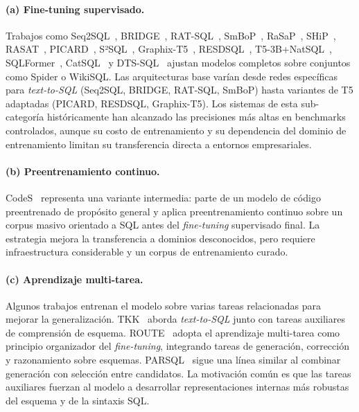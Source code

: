 \paragraph{(a) Fine-tuning supervisado.} Trabajos como
Seq2SQL~\cite{Seq2SQL2017}, BRIDGE~\cite{BRIDGE2020},
RAT-SQL~\cite{RAT-SQL2021}, SmBoP~\cite{SmBoP2021},
RaSaP~\cite{RaSaP2021}, SHiP~\cite{SHiP2022},
RASAT~\cite{RASAT2022}, PICARD~\cite{PICARD2022},
S²SQL~\cite{S2SQL2022}, Graphix-T5~\cite{Graphix-T52022},
RESDSQL~\cite{RESDSQL2023}, T5-3B+NatSQL~\cite{T5-3B+NatSQL+TokenPreprocessing2023},
SQLFormer~\cite{SQLFormer2023}, CatSQL~\cite{CatSQL2023} y
DTS-SQL~\cite{DTS-SQL2024} ajustan modelos completos sobre conjuntos como
Spider o WikiSQL. Las arquitecturas base varían desde redes específicas para
\emph{text-to-SQL} (Seq2SQL, BRIDGE, RAT-SQL, SmBoP) hasta variantes de T5
adaptadas (PICARD, RESDSQL, Graphix-T5). Los sistemas de esta sub-categoría
históricamente han alcanzado las precisiones más altas en benchmarks
controlados, aunque su costo de entrenamiento y su dependencia del dominio
de entrenamiento limitan su transferencia directa a entornos empresariales.

\paragraph{(b) Preentrenamiento continuo.} CodeS~\cite{CodeS2024} representa
una variante intermedia: parte de un modelo de código preentrenado de
propósito general y aplica preentrenamiento continuo sobre un corpus
masivo orientado a SQL antes del \emph{fine-tuning} supervisado final. La
estrategia mejora la transferencia a dominios desconocidos, pero requiere
infraestructura considerable y un corpus de entrenamiento curado.

\paragraph{(c) Aprendizaje multi-tarea.} Algunos trabajos entrenan el modelo
sobre varias tareas relacionadas para mejorar la generalización.
TKK~\cite{TKK2022} aborda \emph{text-to-SQL} junto con tareas auxiliares
de comprensión de esquema. ROUTE~\cite{ROUTE2025} adopta el aprendizaje
multi-tarea como principio organizador del \emph{fine-tuning},
integrando tareas de generación, corrección y razonamiento sobre esquemas.
PARSQL~\cite{PARSQL2025} sigue una línea similar al combinar generación con
selección entre candidatos. La motivación común es que las tareas auxiliares
fuerzan al modelo a desarrollar representaciones internas más robustas del
esquema y de la sintaxis SQL.

